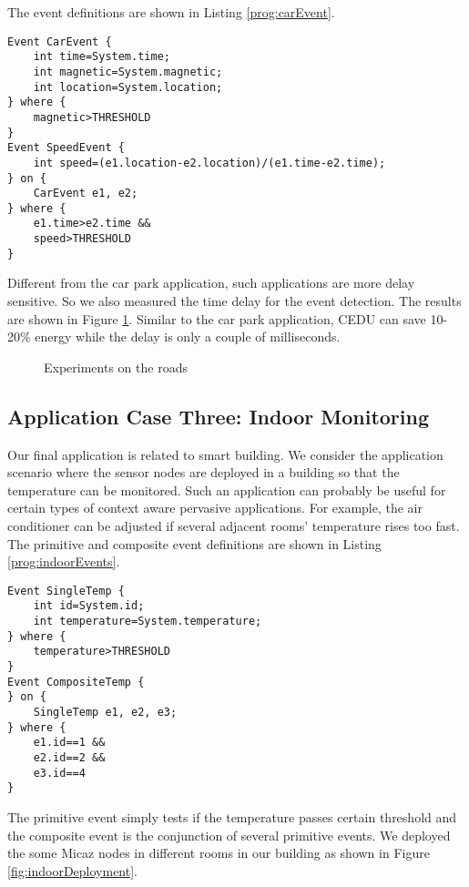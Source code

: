 The event definitions are shown in Listing \ref{prog:carEvent}.

\begin{lstlisting}[caption=Event definition for tracking vehicles, label=prog:carEvent]
Event CarEvent {
	int time=System.time;
	int magnetic=System.magnetic;
	int location=System.location;
} where {
	magnetic>THRESHOLD
}
Event SpeedEvent {
	int speed=(e1.location-e2.location)/(e1.time-e2.time);
} on {
	CarEvent e1, e2;
} where {
	e1.time>e2.time &&
	speed>THRESHOLD
}
\end{lstlisting}

Different from the car park application, such applications are more delay sensitive. So we also measured the time delay for the event detection. The results are shown in Figure \ref{fig:itsResults}. Similar to the car park application, CEDU can save 10-20\% energy while the delay is only a couple of milliseconds.
 
\begin{figure}
\centering
{}
\caption{Experiments on the roads}
\label{fig:itsResults}
\end{figure}

\subsection{Application Case Three: Indoor Monitoring}
Our final application is related to smart building. We consider the application scenario where the sensor nodes are deployed in a building so that the temperature can be monitored. Such an application can probably be useful for certain types of context aware pervasive applications. For example, the air conditioner can be adjusted if several adjacent rooms' temperature rises too fast. The primitive and composite event definitions are shown in Listing \ref{prog:indoorEvents}.

\begin{lstlisting}[caption=Event definition for indoor monitoring, label=prog:indoorEvents]
Event SingleTemp {
	int id=System.id;
	int temperature=System.temperature;
} where {
	temperature>THRESHOLD
}
Event CompositeTemp {
} on {
	SingleTemp e1, e2, e3;
} where {
	e1.id==1 &&
	e2.id==2 &&
	e3.id==4
}
\end{lstlisting}

The primitive event simply tests if the temperature passes certain threshold and the composite event is the conjunction of several primitive events. We deployed the some Micaz nodes in different rooms in our building as shown in Figure \ref{fig:indoorDeployment}.

